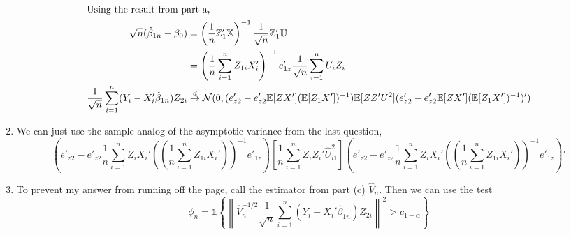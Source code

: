 \documentclass[11pt]{article}
\newcommand{\E}{\mathbb{E}}
\newcommand{\X}{\mathbb{X}}
\newcommand{\Z}{\mathbb{Z}}
\newcommand{\U}{\mathbb{U}}
\begin{document}
\begin{enumerate}[label=\alph*)]
\begin{align*}
\intertext{Using the result from part a,}
\sqrt{n}(\hat{\beta}_{1n} - \beta_0) &= \left(\frac{1}{n} \Z'_1 \X\right)^{-1} \frac{1}{\sqrt{n}}\Z_1' \U\\
&= \left(\frac{1}{n}\sum^n_{i = 1} Z_{1i} X_i'\right)^{-1}e'_{1z} \frac{1}{\sqrt{n}} \sum^n_{i = 1} U_i Z_i\\
\frac{1}{\sqrt{n}} \sum^n_{i = 1} (Y_i - X_i' \hat{\beta}_{1n})Z_{2i} &\overset{d}{\to} \mathcal{N} (0, (e'_{z2} - e'_{z2}\E[ZX'](\E[Z_1 X'])^{-1})\E[ZZ'U^2](e'_{z2} - e'_{z2}\E[ZX'](\E[Z_1 X'])^{-1})')
\end{align*}
\item
We can just use the sample analog of the asymptotic variance from the last question,
\[
(e'_{z2} - e'_{z2} \frac{1}{n} \sum^n_{i = 1} Z_i X_i' \left(\left(\frac{1}{n} \sum^n_{i  = 1} Z_{1i}X_i'\right)\right)^{-1} e'_{1z})
\left[\frac{1}{n} \sum^n_{i = 1} Z_i Z_i' \hat{U}_{i1}^2\right]
(e'_{z2} - e'_{z2} \frac{1}{n} \sum^n_{i = 1} Z_i X_i' \left(\left(\frac{1}{n} \sum^n_{i  = 1} Z_{1i}X_i'\right)\right)^{-1} e'_{1z})'
\]
\item
To prevent my answer from running off the page, call the estimator from part (c) $\hat{V}_n$. Then we can use the test
\[
\phi_n = \mathbb{1} \left\{\left\|\hat{V}_n^{-1/2} \frac{1}{\sqrt{n}} \sum^n_{i = 1} (Y_i - X_i' \hat{\beta}_{1n})Z_{2i}\right\|^2 > c_{1 - \alpha}\right\}
\]
  \end{enumerate}
\end{document}
